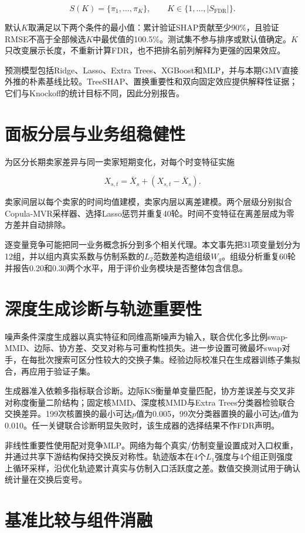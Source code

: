 \documentclass{sufethesismas}
\begin{document}
\[
S(K)=\{\pi_1,\ldots,\pi_K\},\qquad K\in\{1,\ldots,|S_{\mathrm{FDR}}|\}.
\]

默认\(K\)取满足以下两个条件的最小值：累计验证SHAP贡献至少90\%，且验证RMSE不高于全部候选\(K\)中最优值的100.5\%。测试集不参与排序或默认值确定。\(K\)只改变展示长度，不重新计算FDR，也不把排名前列解释为更强的因果效应。

预测模型包括Ridge、Lasso、Extra Trees、XGBoost和MLP，并与本期GMV直接外推的朴素基线比较。TreeSHAP、置换重要性和双向固定效应提供解释性证据；它们与Knockoff的统计目标不同，因此分别报告。

\section{面板分层与业务组稳健性}

为区分长期卖家差异与同一卖家短期变化，对每个时变特征实施

\[
X_{s,t}=\bar X_s+(X_{s,t}-\bar X_s).
\]

卖家间层以每个卖家的时间均值建模，卖家内层以离差建模。两个层级分别拟合Copula-MVR采样器、选择Lasso惩罚并重复40轮。时间不变特征在离差层成为零方差并自动排除。

逐变量竞争可能把同一业务概念拆分到多个相关代理。本文事先把31项变量划分为12组，并以组内真实系数与仿制系数的\(L_2\)范数差构造组级\(W_g\)。组级分析重复60轮并报告0.20和0.30两个水平，用于评价业务模块是否整体包含信息。

\section{深度生成诊断与轨迹重要性}

噪声条件深度生成器以真实特征和同维高斯噪声为输入，联合优化多比例swap-MMD、边际、协方差、交叉对称与可重构性损失。进一步设置可微最坏swap对手，在每批次搜索可区分性较大的交换子集。经验边际校准只在生成器训练子集拟合，再应用于验证子集。

生成器准入依赖多指标联合诊断。边际KS衡量单变量匹配，协方差误差与交叉非对称度衡量二阶结构；固定核MMD、深度核MMD与Extra Trees分类器检验联合交换差异。199次核置换的最小可达\(p\)值为0.005，99次分类器置换的最小可达\(p\)值为0.010。任一关键联合诊断明显失败时，该生成器的选择结果不作FDR声明。

非线性重要性使用配对竞争MLP。网络为每个真实/仿制变量设置成对入口权重，并通过共享下游结构保持交换反对称性。轨迹版本在4个\(L_1\)强度与4个组正则强度上循环采样，沿优化轨迹累计真实与仿制入口活跃度之差。数值交换测试用于确认统计量在交换后变号。

\section{基准比较与组件消融}
\end{document}

